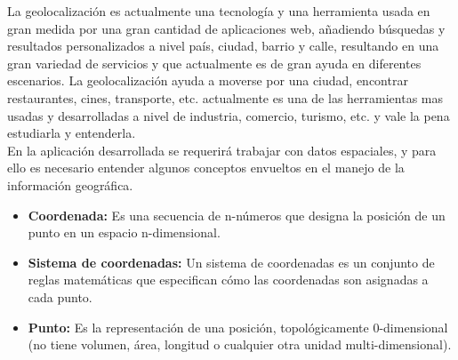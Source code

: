  La geolocalización es actualmente una tecnología y una herramienta usada en gran medida por una gran cantidad de aplicaciones web, añadiendo búsquedas y resultados personalizados a nivel país, ciudad, barrio y calle, resultando en una gran variedad de servicios y que actualmente es de gran ayuda en diferentes escenarios. La geolocalización ayuda a moverse por una ciudad, encontrar restaurantes, cines, transporte, etc. actualmente es una de las herramientas mas usadas y desarrolladas a nivel de industria, comercio, turismo, etc. y vale la pena estudiarla y entenderla.\\




    En la aplicación desarrollada se requerirá trabajar con datos espaciales, y para ello es necesario entender algunos conceptos envueltos en el manejo de la información geográfica.

    \begin{itemize}
      \item \textbf{Coordenada:} Es una secuencia de n-números que designa la posición de un punto en un espacio n-dimensional.
      \item \textbf{Sistema de coordenadas:} Un sistema de coordenadas es  un conjunto de reglas matemáticas que especifican cómo las coordenadas son asignadas  a cada  punto.
      \item \textbf{Punto:} Es  la representación de una posición, topológicamente 0-dimensional (no tiene volumen, área, longitud o cualquier otra unidad multi-dimensional).
    \end{itemize}




